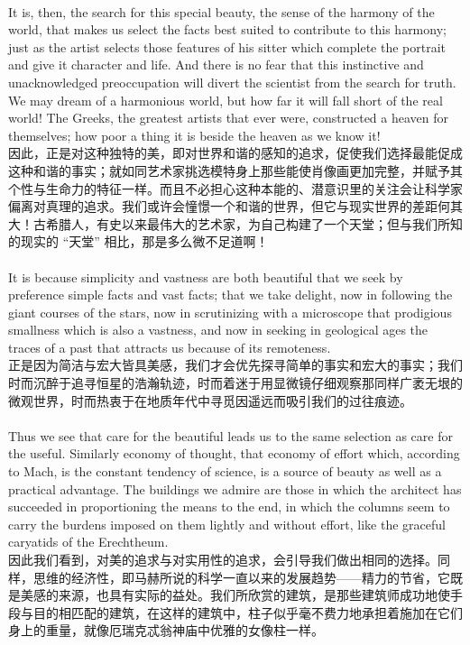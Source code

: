 \documentclass{article}
\begin{document}
\\
It is, then, the search for this special beauty, the sense of the harmony of the world, that makes us select the facts best suited to contribute to this harmony; just as the artist selects those features of his sitter which complete the portrait and give it character and life. And there is no fear that this instinctive and unacknowledged preoccupation will divert the scientist from the search for truth. We may dream of a harmonious world, but how far it will fall short of the real world! The Greeks, the greatest artists that ever were, constructed a heaven for themselves; how poor a thing it is beside the heaven as we know it!\\
因此，正是对这种独特的美，即对世界和谐的感知的追求，促使我们选择最能促成这种和谐的事实；就如同艺术家挑选模特身上那些能使肖像画更加完整，并赋予其个性与生命力的特征一样。而且不必担心这种本能的、潜意识里的关注会让科学家偏离对真理的追求。我们或许会憧憬一个和谐的世界，但它与现实世界的差距何其大！古希腊人，有史以来最伟大的艺术家，为自己构建了一个天堂；但与我们所知的现实的 “天堂” 相比，那是多么微不足道啊！ \\

\\
It is because simplicity and vastness are both beautiful that we seek by preference simple facts and vast facts; that we take delight, now in following the giant courses of the stars, now in scrutinizing with a microscope that prodigious smallness which is also a vastness, and now in seeking in geological ages the traces of a past that attracts us because of its remoteness.\\
正是因为简洁与宏大皆具美感，我们才会优先探寻简单的事实和宏大的事实；我们时而沉醉于追寻恒星的浩瀚轨迹，时而着迷于用显微镜仔细观察那同样广袤无垠的微观世界，时而热衷于在地质年代中寻觅因遥远而吸引我们的过往痕迹。 \\

\\
Thus we see that care for the beautiful leads us to the same selection as care for the useful. Similarly economy of thought, that economy of effort which, according to Mach, is the constant tendency of science, is a source of beauty as well as a practical advantage. The buildings we admire are those in which the architect has succeeded in proportioning the means to the end, in which the columns seem to carry the burdens imposed on them lightly and without effort, like the graceful caryatids of the Erechtheum.\\
因此我们看到，对美的追求与对实用性的追求，会引导我们做出相同的选择。同样，思维的经济性，即马赫所说的科学一直以来的发展趋势——精力的节省，它既是美感的来源，也具有实际的益处。我们所欣赏的建筑，是那些建筑师成功地使手段与目的相匹配的建筑，在这样的建筑中，柱子似乎毫不费力地承担着施加在它们身上的重量，就像厄瑞克忒翁神庙中优雅的女像柱一样。 \\ 
\end{document}
